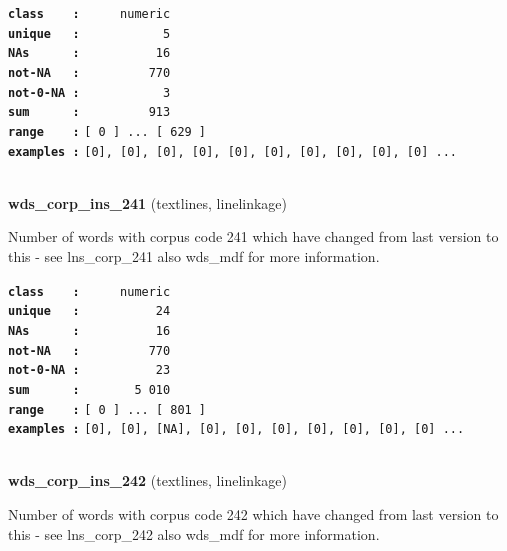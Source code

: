 \documentclass[]{article}
\begin{document}
\textbf{\texttt{class\ \ \ \ :}} \texttt{~~~~~numeric}\\
\textbf{\texttt{unique\ \ \ :}} \texttt{~~~~~~~~~~~5}\\
\textbf{\texttt{NAs\ \ \ \ \ \ :}} \texttt{~~~~~~~~~~16}\\
\textbf{\texttt{not-NA\ \ \ :}} \texttt{~~~~~~~~~770}\\
\textbf{\texttt{not-0-NA\ :}} \texttt{~~~~~~~~~~~3}\\
\textbf{\texttt{sum\ \ \ \ \ \ :}} \texttt{~~~~~~~~~913}\\
\textbf{\texttt{range\ \ \ \ :}}
\texttt{{[}\ 0\ {]}\ ...\ {[}\ 629\ {]}}\\
\textbf{\texttt{examples\ :}}
\texttt{{[}0{]},\ {[}0{]},\ {[}0{]},\ {[}0{]},\ {[}0{]},\ {[}0{]},\ {[}0{]},\ {[}0{]},\ {[}0{]},\ {[}0{]}\ ...}\\

~

\textbf{wds\_corp\_ins\_241} (textlines, linelinkage)

Number of words with corpus code 241 which have changed from last
version to this - see lns\_corp\_241 also wds\_mdf for more information.

\textbf{\texttt{class\ \ \ \ :}} \texttt{~~~~~numeric}\\
\textbf{\texttt{unique\ \ \ :}} \texttt{~~~~~~~~~~24}\\
\textbf{\texttt{NAs\ \ \ \ \ \ :}} \texttt{~~~~~~~~~~16}\\
\textbf{\texttt{not-NA\ \ \ :}} \texttt{~~~~~~~~~770}\\
\textbf{\texttt{not-0-NA\ :}} \texttt{~~~~~~~~~~23}\\
\textbf{\texttt{sum\ \ \ \ \ \ :}} \texttt{~~~~~~~5~010}\\
\textbf{\texttt{range\ \ \ \ :}}
\texttt{{[}\ 0\ {]}\ ...\ {[}\ 801\ {]}}\\
\textbf{\texttt{examples\ :}}
\texttt{{[}0{]},\ {[}0{]},\ {[}NA{]},\ {[}0{]},\ {[}0{]},\ {[}0{]},\ {[}0{]},\ {[}0{]},\ {[}0{]},\ {[}0{]}\ ...}\\

~

\textbf{wds\_corp\_ins\_242} (textlines, linelinkage)

Number of words with corpus code 242 which have changed from last
version to this - see lns\_corp\_242 also wds\_mdf for more information.
\end{document}
